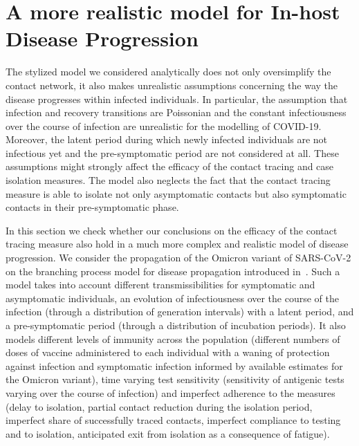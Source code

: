 \documentclass[aps,twocolumn,superscriptaddress,nofootinbib,pre,floatfix]{revtex4-1}
\begin{document}
\section{A more realistic model for In-host Disease Progression}


The stylized model we considered analytically does not only
oversimplify the contact network, it also makes unrealistic
assumptions concerning the way the disease progresses within infected
individuals. In particular, the assumption that infection and recovery
transitions are Poissonian and the constant infectiousness over the
course of infection are unrealistic for the modelling of COVID-19. Moreover,
the latent period during which newly infected individuals are not
infectious yet and the pre-symptomatic period are not considered at
all. These assumptions might strongly affect the efficacy of the
contact tracing and case isolation measures. The model also neglects
the fact that the contact tracing measure is able to isolate not only
asymptomatic contacts but also symptomatic contacts in their
pre-symptomatic phase.

In this section we check whether our conclusions on the efficacy of
the contact tracing measure also hold in a much more complex and
realistic model of disease progression.
We consider the propagation of the Omicron variant of SARS-CoV-2 on
the branching process model for disease propagation introduced in~\cite{lancet}.
Such a model takes into account
different transmissibilities for symptomatic and asymptomatic
individuals, an evolution of infectiousness over the course of the
infection (through a distribution of generation
intervals) with a latent period, and a pre-symptomatic period (through a distribution of
incubation periods). It also models different levels of immunity
across the population (different numbers of doses of vaccine
administered to each individual with a waning of protection against
infection and symptomatic infection informed by available estimates
for the Omicron variant), time varying test sensitivity (sensitivity of antigenic
tests varying over the course of infection) and imperfect adherence to the
measures (delay to isolation, partial contact reduction during the
isolation period, imperfect share of successfully traced contacts,
imperfect compliance to testing and to isolation, anticipated exit
from isolation as a consequence of fatigue).
\end{document}
